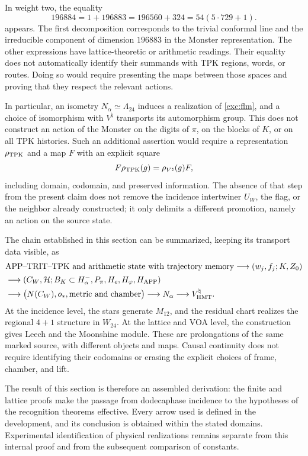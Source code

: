 In weight two, the equality
\[
 196884=1+196883=196560+324=54(5\cdot729+1).
\]
appears. The first decomposition corresponds to the trivial conformal line and the
irreducible component of dimension $196883$ in the Monster
representation. The other expressions have lattice-theoretic or
arithmetic readings. Their equality does not automatically identify their summands
with TPK regions, words, or routes. Doing so would require
presenting the maps between those spaces and proving that they respect the
relevant actions.

In particular, an isometry $N_\alpha\simeq\Lambda_{24}$ induces
a realization of \eqref{exc:flm}, and a choice of isomorphism
with $V^\natural$ transports its automorphism group. This does not
construct an action of the Monster on the digits of
$\pi$, on the blocks of $K$, or on all TPK histories.
Such an additional assertion would require a representation
$\rho_{\rm TPK}$ and a map $F$ with an explicit square
\[
 F\rho_{\rm TPK}(g)=\rho_{V^\natural}(g)F,
\]
including domain, codomain, and preserved information. The absence
of that step from the present claim does not remove the incidence
intertwiner $U_W$, the flag, or the neighbor already constructed; it only
delimits a different promotion, namely an action on the source state.

The chain established in this section can be summarized, keeping
its transport data visible, as
\begin{align*}
 &\text{APP--TRIT--TPK and arithmetic state with trajectory memory}
   \longrightarrow (w_j,f_j;K,Z_0)\\
 &\longrightarrow (C_W,\mathcal H;B_K\subset H^-_\alpha,
                   P_\pi,H_e,H_\varphi,H_{\rm APP})\\
 &\longrightarrow \bigl(N(C_W),o_*,\text{metric and chamber}\bigr)
   \longrightarrow N_\alpha
   \longrightarrow V^\natural_{\rm HMT}.
\end{align*}
At the incidence level, the stars generate $M_{12}$, and the
residual chart realizes the regional $4+1$ structure in $W_{24}$.
At the lattice and VOA level, the construction gives Leech and the
Moonshine module. These are prolongations of the same marked source, with
different objects and maps. Causal continuity does not require
identifying their codomains or erasing the explicit choices
of frame, chamber, and lift.

The result of this section is therefore an assembled derivation:
the finite and lattice proofs make the passage from dodecaphase incidence
to the hypotheses of the recognition theorems effective. Every arrow used is
defined in the development, and its conclusion is obtained within the stated
domains. Experimental identification of physical realizations remains
separate from this internal proof and from the subsequent comparison of
constants.
